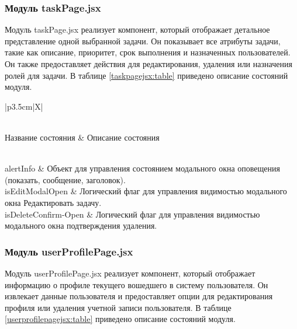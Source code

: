 \subsubsection{Модуль taskPage.jsx}
Модуль taskPage.jsx реализует компонент, который отображает детальное представление одной выбранной задачи. Он показывает все атрибуты задачи, такие как описание, приоритет, срок выполнения и назначенных пользователей. Он также предоставляет действия для редактирования, удаления или назначения ролей для задачи. В таблице \ref{taskpagejsx:table} приведено описание состояний модуля.

\begin{xltabular}{\textwidth}{|p{3.5cm}|X|}
	\caption{Описание состояний, используемых в taskPage.jsx\label{taskpagejsx:table}}\\
	\hline \centrow \setlength{\baselineskip}{0.7\baselineskip} Название состояния & \centrow \setlength{\baselineskip}{0.7\baselineskip} Описание состояния \\\hline
	\endfirsthead
	\caption*{Продолжение таблицы \ref{taskpagejsx:table}}\\ \hline
	\finishhead
	alertInfo & Объект для управления состоянием модального окна оповещения (показать, сообщение, заголовок). \\ \hline
	isEditModalOpen & Логический флаг для управления видимостью модального окна Редактировать задачу. \\ \hline
	isDeleteConfirm-Open & Логический флаг для управления видимостью модального окна подтверждения удаления. \\ \hline
\end{xltabular}

\subsubsection{Модуль userProfilePage.jsx}
Модуль userProfilePage.jsx реализует компонент, который отображает информацию о профиле текущего вошедшего в систему пользователя. Он извлекает данные пользователя и предоставляет опции для редактирования профиля или удаления учетной записи пользователя. В таблице \ref{userprofilepagejsx:table} приведено описание состояний модуля.

